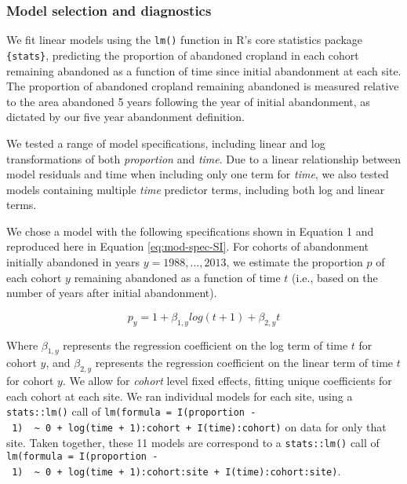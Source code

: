 \documentclass[9pt,twocolumn,twoside,lineno]{pnas-new}
\begin{document}
\hypertarget{model-selection-and-diagnostics}{%
\subsubsection{Model selection and diagnostics}\label{model-selection-and-diagnostics}}

We fit linear models using the \texttt{lm()} function in R's core statistics package \texttt{\{stats\}}, predicting the proportion of abandoned cropland in each cohort remaining abandoned as a function of time since initial abandonment at each site.
The proportion of abandoned cropland remaining abandoned is measured relative to the area abandoned 5 years following the year of initial abandonment, as dictated by our five year abandonment definition.

We tested a range of model specifications, including linear and log transformations of both \emph{proportion} and \emph{time}.
Due to a linear relationship between model residuals and time when including only one term for \emph{time}, we also tested models containing multiple \emph{time} predictor terms, including both log and linear terms.

We chose a model with the following specifications shown in Equation 1 and reproduced here in Equation \eqref{eq:mod-spec-SI}.
For cohorts of abandonment initially abandoned in years \(y = 1988, ... , 2013\), we estimate the proportion \(p\) of each cohort \(y\) remaining abandoned as a function of time \(t\) (i.e., based on the number of years after initial abandonment).

\begin{equation}
p_{y} = 1 + \beta_{1,y} log(t + 1) + \beta_{2,y} t \label{eq:mod-spec-SI}
\end{equation}

Where \(\beta_{1,y}\) represents the regression coefficient on the log term of time \(t\) for cohort \(y\), and \(\beta_{2,y}\) represents the regression coefficient on the linear term of time \(t\) for cohort \(y\).
We allow for \emph{cohort} level fixed effects, fitting unique coefficients for each cohort at each site.
We ran individual models for each site, using a \texttt{stats::lm()} call of \texttt{lm(formula\ =\ I(proportion\ -\ 1)\ \ \textasciitilde{}\ 0\ +\ log(time\ +\ 1):cohort\ +\ I(time):cohort)} on data for only that site.
Taken together, these 11 models are correspond to a \texttt{stats::lm()} call of \texttt{lm(formula\ =\ I(proportion\ -\ 1)\ \ \textasciitilde{}\ 0\ +\ log(time\ +\ 1):cohort:site\ +\ I(time):cohort:site)}.
\end{document}

